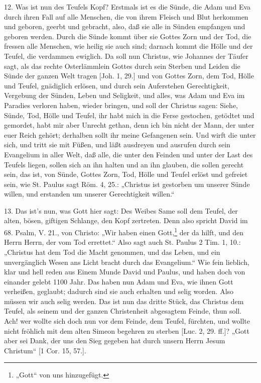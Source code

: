 12. Was ist nun des Teufels Kopf? Erstmals ist es die Sünde, die Adam und Eva durch ihren Fall auf alle Menschen, die von ihrem Fleisch und Blut herkommen und geboren, geerbt und gebracht, also, daß sie alle in Sünden empfangen und geboren werden. Durch die Sünde kommt über sie Gottes Zorn und der Tod, die fressen alle Menschen, wie heilig sie
auch sind; darnach kommt die Hölle und der Teufel, die verdammen ewiglich. Da soll nun Christus, wie Johannes der Täufer sagt, als das rechte Osterlämmlein Gottes durch sein Sterben und Leiden die Sünde der ganzen Welt tragen [Joh. 1, 29.] und von Gottes Zorn, dem Tod, Hölle und Teufel, gnädiglich erlösen, und durch sein Auferstehen Gerechtigkeit, Vergebung der Sünden, Leben und Seligkeit, und alles, was Adam und Eva im Paradies verloren haben, wieder bringen, und soll der Christus sagen: Siehe, Sünde, Tod, Hölle und Teufel, ihr habt mich in die Ferse gestochen, getödtet und gemordet, habt mir aber Unrecht gethan, denn ich bin nicht der Mann, der unter euer Reich gehört; derhalben sollt ihr meine Gefangenen sein. Und wirft die unter sich, und tritt sie mit Füßen, und läßt ausdreyen und ausrufen durch sein Evangelium in aller Welt, daß alle, die unter den Feinden und unter der Last des Teufels liegen, sollen sich an ihn halten und an ihn glauben, die sollen gerecht sein, das ist, von Sünde, Gottes Zorn, Tod, Hölle und Teufel erlöst und gefreiet sein, wie St. Paulus sagt Röm. 4, 25.: „Christus ist gestorben um unserer Sünde willen, und erstanden um unserer Gerechtigkeit willen.“

13. Das ist’s nun, was Gott hier sagt: Des Weibes Same soll dem Teufel, der alten, bösen, giftigen Schlange, den Kopf zertreten. Denn also spricht David im 68. Psalm, V. 21., von Christo: „Wir haben einen Gott,\footnote{„Gott“ von uns hinzugefügt.} der da hilft, und den Herrn Herrn, der vom Tod errettet.“ Also sagt auch St. Paulus 2 Tim. 1, 10.: „Christus hat dem Tod die Macht genommen, und das Leben, und ein unvergänglich Wesen ans Licht bracht durch das Evangelium.“ Wie fein lieblich, klar und hell reden aus Einem Munde David und Paulus, und haben doch von einander gelebt 1100 Jahr. Das haben nun Adam und Eva, wie ihnen Gott verheißen, geglaubt; dadurch sind sie auch erhalten und selig worden. Also müssen wir auch selig werden. Das ist nun das dritte Stück, das Christus dem Teufel, als seinem und der ganzen Christenheit abgesagtem Feinde, thun soll. Ach! wer wollte sich doch nun vor dem Feinde, dem Teufel, fürchten, und wollte nicht fröhlich mit dem alten Simeon begehren zu sterben [Luc. 2, 29. ff.]? „Gott aber sei Dank, der uns den Sieg gegeben hat durch unsern Herrn Jesum Christum“ [1 Cor. 15, 57.].

